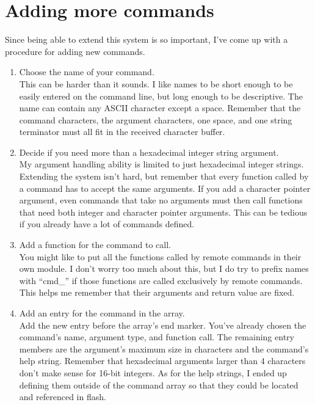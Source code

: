 \section{Adding more commands}
Since being able to extend this system is so important, I've come up with a procedure for adding new commands.
\begin{enumerate}
    \item Choose the name of your command.\\
            This can be harder than it sounds.  I like names to be short enough to be easily entered on the command line, but long enough to be descriptive.  The name can contain any ASCII character except a space.  Remember that the command characters, the argument characters, one space, and one string terminator must all fit in the received character buffer. 
    \item Decide if you need more than a hexadecimal integer string argument.\\
            My argument handling ability is limited to just hexadecimal integer strings.  Extending the system isn't hard, but remember that every function called by a command has to accept the same arguments.  If you add a character pointer argument, even commands that take no arguments must then call functions that need both integer and character pointer arguments.  This can be tedious if you already have a lot of commands defined.  
    \item Add a function for the command to call.\\
            You might like to put all the functions called by remote commands in their own module.  I don't worry too much about this, but I do try to prefix names with ``cmd\_'' if those functions are called exclusively by remote commands.  This helps me remember that their arguments and return value are fixed.  
    \item Add an entry for the command in the array.\\
            Add the new entry before the array's end marker.  You've already chosen the command's name, argument type, and function call.  The remaining entry members are the argument's maximum size in characters and the command's help string.  Remember that hexadecimal arguments larger than 4 characters don't make sense for 16-bit integers.  As for the help strings, I ended up defining them outside of the command array so that they could be located and referenced in flash.  
\end{enumerate}


